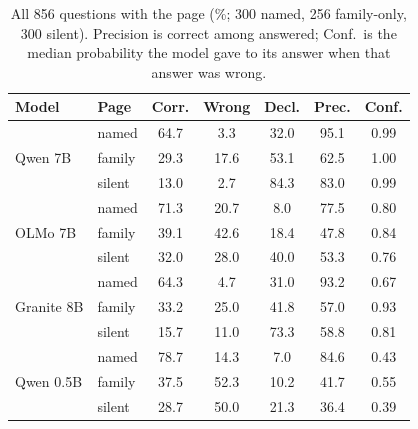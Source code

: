 \documentclass[letterpaper]{article} %
\begin{document}
\begin{table}[h]
\centering
\small
\setlength{\tabcolsep}{2.8pt}
\begin{tabular}{llccccc}
\toprule
Model & Page & Corr. & Wrong & Decl. & Prec. & Conf. \\
\midrule
\multirow{3}{*}{Qwen 7B} & named & 64.7 & 3.3 & 32.0 & 95.1 & 0.99 \\
 & family & 29.3 & 17.6 & 53.1 & 62.5 & 1.00 \\
 & silent & 13.0 & 2.7 & 84.3 & 83.0 & 0.99 \\
\midrule
\multirow{3}{*}{OLMo 7B} & named & 71.3 & 20.7 & 8.0 & 77.5 & 0.80 \\
 & family & 39.1 & 42.6 & 18.4 & 47.8 & 0.84 \\
 & silent & 32.0 & 28.0 & 40.0 & 53.3 & 0.76 \\
\midrule
\multirow{3}{*}{Granite 8B} & named & 64.3 & 4.7 & 31.0 & 93.2 & 0.67 \\
 & family & 33.2 & 25.0 & 41.8 & 57.0 & 0.93 \\
 & silent & 15.7 & 11.0 & 73.3 & 58.8 & 0.81 \\
\midrule
\multirow{3}{*}{Qwen 0.5B} & named & 78.7 & 14.3 & 7.0 & 84.6 & 0.43 \\
 & family & 37.5 & 52.3 & 10.2 & 41.7 & 0.55 \\
 & silent & 28.7 & 50.0 & 21.3 & 36.4 & 0.39 \\
\bottomrule
\end{tabular}
\caption{All 856 questions with the page (\%; 300 named, 256 family-only, 300
silent). Precision is correct among answered; Conf.\ is the median probability
the model gave to its answer when that answer was wrong.}
\label{tab:all_page}
\end{table}
\end{document}
